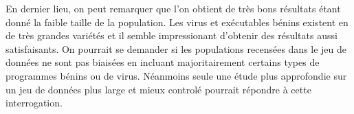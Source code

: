 \documentclass[11pt,a4paper]{article}
\begin{document}
	En dernier lieu, on peut remarquer que l'on obtient de très bons résultats étant donné la faible taille de la population. Les virus et exécutables bénins existent en de très grandes variétés et il semble impressionant d'obtenir des résultats aussi satisfaisants. On pourrait se demander si les populations recensées dans le jeu de données ne sont pas biaisées en incluant majoritairement certains types de programmes bénins ou de virus. Néanmoins seule une étude plus approfondie sur un jeu de données plus large et mieux controlé pourrait répondre à cette interrogation.




%
\end{document}
